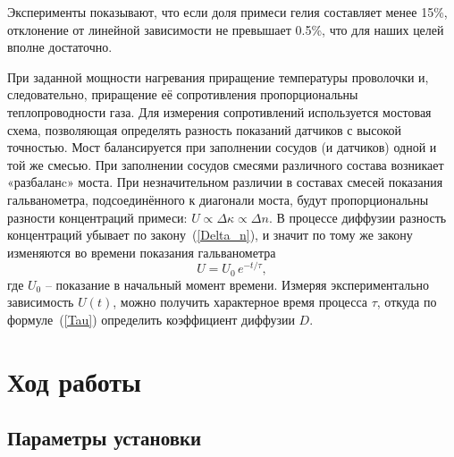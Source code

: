 \documentclass[a4paper, 10pt, twocolumn]{article}
\begin{document}
    Эксперименты показывают, что если доля примеси гелия составляет менее 15\%, отклонение от линейной зависимости не превышает 0.5\%, что для наших целей вполне достаточно.


    При заданной мощности нагревания приращение температуры  проволочки и, следовательно, приращение её сопротивления пропорциональны теплопроводности газа. Для измерения сопротивлений используется мостовая схема, позволяющая определять разность показаний датчиков с высокой точностью. Мост балансируется при заполнении сосудов (и датчиков) одной и той же смесью. При заполнении сосудов смесями различного состава возникает «разбаланc» моста. При незначительном различии в составах смесей показания гальванометра, подсоединённого к диагонали моста, будут пропорциональны разности концентраций примеси: $U\propto\Delta \kappa \propto \Delta n$. В процессе диффузии разность концентраций убывает по закону~(\ref{Delta_n}), и значит по тому же закону изменяются во времени показания гальванометра
    \begin{equation}
        \label{U}
        U = U_0 \, e^{-t / \tau},
    \end{equation}
    где $U_0$ -- показание в начальный момент времени. Измеряя экспериментально зависимость $U(t)$, можно получить характерное время процесса $\tau$, откуда по формуле~(\ref{Tau}) определить коэффициент диффузии $D$.

\section{Ход работы}
\subsection{Параметры установки}
\end{document}
